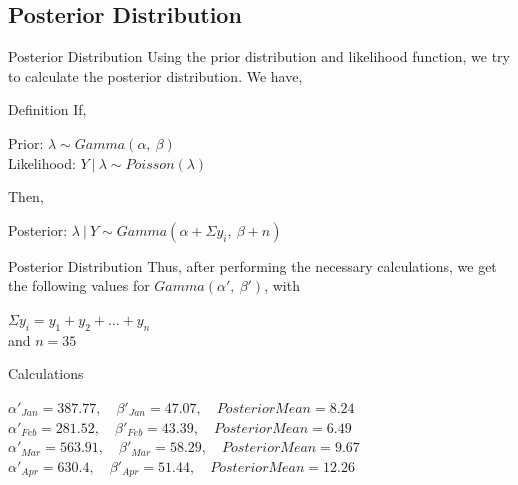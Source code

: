 \documentclass{beamer}
\begin{document}
\begin{frame}
\section{Posterior Distribution}
\end{frame}

\begin{frame}{Posterior Distribution}
    Using the prior distribution and likelihood function, we try to calculate the posterior distribution. We have,
    \begin{block}{Definition}
        If,
        \begin{center}
            Prior: $\lambda \sim Gamma(\alpha,\: \beta)$ \\
            Likelihood: $Y\:|\:\lambda \sim Poisson(\lambda)$ \\
        \end{center}
        Then, 
        \begin{center}
            Posterior: $\lambda \:|\: Y \sim Gamma(\alpha + \Sigma y_i, \:\beta + n)$
        \end{center}
    \end{block}
\end{frame}

\begin{frame}{Posterior Distribution}
    Thus, after performing the necessary calculations, we get the following values for $Gamma(\alpha',\:\beta')$, with
    \begin{center}
        $\Sigma y_i = y_1 + y_2 + ... + y_n$ \\ and
        $n = 35$
    \end{center}
    \begin{block}{Calculations}
        \begin{center}
            $\alpha'_{Jan} = 387.77, \quad \beta'_{Jan} = 47.07, \quad PosteriorMean = 8.24$ \\ 
            $\alpha'_{Feb} = 281.52, \quad \beta'_{Feb} = 43.39, \quad PosteriorMean = 6.49$ \\ 
            $\alpha'_{Mar} = 563.91, \quad \beta'_{Mar} = 58.29, \quad PosteriorMean = 9.67$ \\ 
            $\alpha'_{Apr} = 630.4, \quad \beta'_{Apr} = 51.44, \quad PosteriorMean = 12.26$ \\ 
        \end{center}
    \end{block}
\end{frame} 
\end{document}
